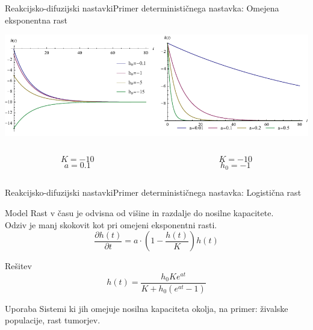 \documentclass{beamer}
\begin{document}
\begin{frame}{Reakcijsko-difuzijski nastavki}{Primer determinističnega nastavka: Omejena eksponentna rast}
\begin{center}
  \hspace*{-0.09\textwidth}\includegraphics[width=1.2\textwidth]{slike/omejena-eksponentna-rast}
  \footnotesize
\begin{columns}
  \begin{column}{0.5\textwidth}
  \[ K = -10 \]
  \[ a = 0.1 \]
  \end{column}
  \begin{column}{0.5\textwidth}
  \[ K = -10 \]
  \[ h_0 =-1 \]
  \end{column}
\end{columns}
\end{center}
\end{frame}


\begin{frame}{Reakcijsko-difuzijski nastavki}{Primer determinističnega nastavka: Logistična rast}
\begin{block}{Model}
  Rast v času je odvisna od višine in razdalje do nosilne kapacitete. \\
  Odziv je manj skokovit kot pri omejeni eksponentni rasti.
  \begin{equation} \frac{\partial h(t)}{\partial t} = a \cdot \left( 1 - \frac{h(t)}{K} \right) h(t) \end{equation}
\end{block}
\begin{block}{Rešitev}
  \begin{equation} h(t) = \frac{h_0 K e^{a t}}{K + h_0 (e^{a t}-1)} \end{equation}
\end{block}
\begin{block}{Uporaba}
  Sistemi ki jih omejuje nosilna kapaciteta okolja, na primer: živalske populacije, rast tumorjev.
\end{block}
\end{frame}
\end{document}
